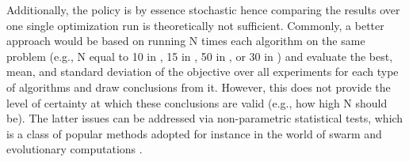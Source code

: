 \documentclass[a4paper]{article}
\begin{document}
Additionally, the policy is by essence stochastic hence comparing the results over one single optimization run is theoretically not sufficient. Commonly, a better approach would be based on running N times each algorithm on the same problem (e.g., N equal to 10 in \cite{ivanov2021assessment}, 15 in \cite{meneses2009particle}, 50 in \cite{meneses2015acrossentropy}, or 30 in \cite{francois2012comparison}) and evaluate the best, mean, and standard deviation of the objective over all experiments for each type of algorithms and draw conclusions from it. However, this does not provide the level of certainty at which these conclusions are valid (e.g., how high N should be). The latter issues can be addressed via non-parametric statistical tests, which is a class of popular methods adopted for instance in the world of swarm and evolutionary computations \cite{derrac2011apractical,schlunz2016acomparative}. 
 
\end{document}
